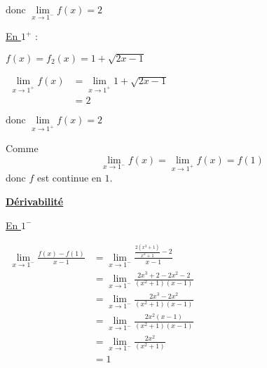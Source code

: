 \documentclass[12pt,a4paper]{article}
\begin{document}
\begin{enumerate}
          \( \text{donc } \lim\limits_{x \to 1^-} f(x) = 2 \)

          \bigskip

          \underline{En \( 1^+ \)} :

          \( f(x) = f_2(x) = 1 + \sqrt{2x -1} \)

          \( \begin{aligned}
              \lim\limits_{x \to 1^+} f(x) & = \lim\limits_{x \to 1^+} 1 + \sqrt{2x -1} \\
                                           & = 2
          \end{aligned} \)

          \(  \text{donc } \lim\limits_{x \to 1^+} f(x) = 2 \)

          Comme
          \[
              \lim\limits_{x \to 1^-} f(x) = \lim\limits_{x \to 1^+} f(x) = f(1)
          \]
          donc \( f \) est continue en \( 1 \).

          \bigskip

          \underline{\textbf{Dérivabilité}}

          \underline{En \( 1^- \)}

          \(
          \begin{aligned}
              \lim\limits_{x \to 1^-} \frac{f(x) - f(1)}{x - 1} & = \lim\limits_{x \to 1^-} \frac{\frac{2(x^3+1)}{x^2+1} -2}{x-1}\\  
                                                                & = \lim\limits_{x \to 1^-} \frac{2x^3 +2 - 2x^2 - 2}{(x^2+1)(x-1)}\\
                                                                & = \lim\limits_{x \to 1^-} \frac{2x^3 - 2x^2}{(x^2+1)(x-1)}\\
                                                                & = \lim\limits_{x \to 1^-} \frac{2x^2 (x-1)}{(x^2+1)(x-1)}\\
                                                                & = \lim\limits_{x \to 1^-} \frac{2x^2}{(x^2+1)}\\
                                                                & = 1
          \end{aligned}
          \)
\end{enumerate}
\end{document}
